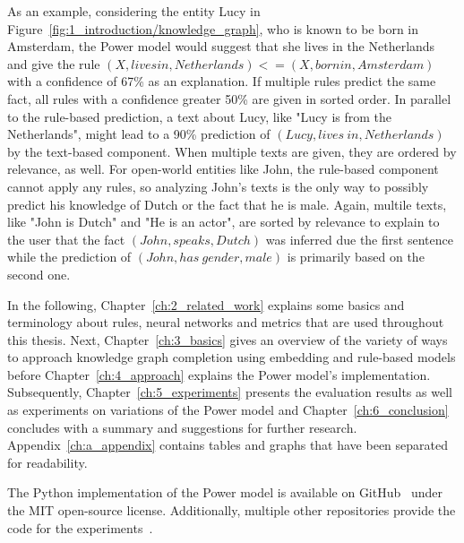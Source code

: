 As an example, considering the entity Lucy in Figure~\ref{fig:1_introduction/knowledge_graph}, who is known to be born in Amsterdam, the Power model would suggest that she lives in the Netherlands and give the rule $(X, lives in, Netherlands) <= (X, born in, Amsterdam)$ with a confidence of 67\% as an explanation. If multiple rules predict the same fact, all rules with a confidence greater 50\% are given in sorted order. In parallel to the rule-based prediction, a text about Lucy, like "Lucy is from the Netherlands", might lead to a 90\% prediction of $(Lucy, lives~in, Netherlands)$ by the text-based component. When multiple texts are given, they are ordered by relevance, as well. For open-world entities like John, the rule-based component cannot apply any rules, so analyzing John's texts is the only way to possibly predict his knowledge of Dutch or the fact that he is male. Again, multile texts, like "John is Dutch" and "He is an actor", are sorted by relevance to explain to the user that the fact $(John, speaks, Dutch)$ was inferred due the first sentence while the prediction of $(John, has~gender, male)$ is primarily based on the second one.

In the following, Chapter~\ref{ch:2_related_work} explains some basics and terminology about rules, neural networks and metrics that are used throughout this thesis. Next, Chapter~\ref{ch:3_basics} gives an overview of the variety of ways to approach knowledge graph completion using embedding and rule-based models before Chapter~\ref{ch:4_approach} explains the Power model's implementation. Subsequently, Chapter~\ref{ch:5_experiments} presents the evaluation results as well as experiments on variations of the Power model and Chapter~\ref{ch:6_conclusion} concludes with a summary and suggestions for further research. Appendix~\ref{ch:a_appendix} contains tables and graphs that have been separated for readability.

The Python implementation of the Power model is available on GitHub~\cite{GitHubPower} under the MIT open-source license. Additionally, multiple other repositories provide the code for the experiments~\cite{}.
